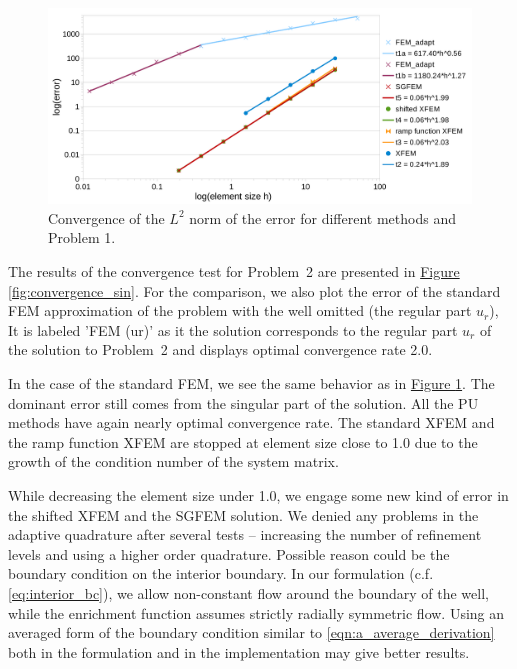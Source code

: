 \documentclass{elsarticle}
\newcommand{\prob}[1]{Problem~{#1}}
\newcommand{\fig}[1]{\hyperref[#1]{Figure \ref{#1}}}
\begin{document}
\begin{figure}[!htb]
  \centering    
  \includegraphics[width=\textwidth]{results/convergence.pdf}
  \caption[Convergence graph \prob{1}]{Convergence of the $L^2$ norm of the error for different methods and Problem 1.}
  \label{fig:convergence}
\end{figure}


The results of the convergence test for \prob{2} are presented in \fig{fig:convergence_sin}.
For the comparison, we also plot the error of the standard FEM approximation of the problem with the well omitted (the regular part $u_r$), 
It is labeled 'FEM (ur)' as it the solution corresponds to the regular part $u_r$ of the solution to \prob{2} and displays optimal convergence rate 2.0.

In the case of the standard FEM, we see the same behavior as in \fig{fig:convergence}. The dominant error still 
comes from the singular part of the solution. All the PU methods have again nearly optimal convergence rate. 
The standard XFEM and the ramp function XFEM
are stopped at element size close to 1.0 due to the growth of the condition number of the system matrix.

While decreasing the element size under 1.0, we engage some new kind of error in the shifted XFEM and the 
SGFEM solution. We denied any problems in the adaptive quadrature after several tests -- increasing the number
of refinement levels and using a higher order quadrature. Possible reason could be the boundary condition 
on the interior boundary. In our formulation (c.f. \eqref{eq:interior_bc}), we allow non-constant flow around the boundary
of the well, while the enrichment function assumes strictly radially symmetric flow. Using an averaged form of the boundary 
condition similar to \eqref{eqn:a_average_derivation} both in the formulation and in the implementation may give better results.
\end{document}
